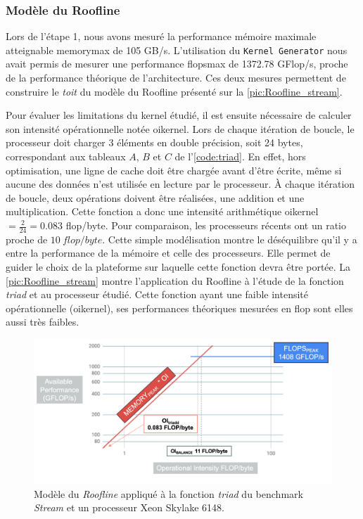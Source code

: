         
    
    \subsubsection{Modèle du Roofline}
        Lors de l'étape 1, nous avons mesuré la performance mémoire maximale atteignable \gls{memorymax} de 105 GB/s. L'utilisation du \verb|Kernel Generator| nous avait permis de mesurer une performance \gls{flopsmax} de 1372.78 GFlop/s, proche de la performance théorique de l'architecture. Ces deux mesures permettent de construire le \textit{toit} du modèle du Roofline présenté sur la \autoref{pic:Roofline_stream}.
        
        Pour évaluer les limitations du \gls{kernel} étudié, il est ensuite nécessaire de calculer son intensité opérationnelle notée \gls{oikernel}. Lors de chaque itération de boucle, le processeur doit charger 3 éléments en double précision, soit 24 bytes, correspondant aux tableaux $A$, $B$ et $C$ de l'\autoref{code:triad}. En effet, hors optimisation, une ligne de cache doit être chargée avant d'être écrite, même si aucune des données n'est utilisée en lecture par le processeur. À chaque itération de boucle, deux opérations doivent être réalisées, une addition et une multiplication. Cette fonction a donc une intensité arithmétique \gls{oikernel} $= \frac{2}{24} = 0.083$ flop/byte.
        Pour comparaison, les processeurs récents ont un ratio proche de $10\ flop/byte$. Cette simple modélisation montre le déséquilibre qu'il y a entre la performance de la mémoire et celle des processeurs. Elle permet de guider le choix de la plateforme sur laquelle cette fonction devra être portée. La \autoref{pic:Roofline_stream} montre l'application du Roofline à l'étude de la fonction \textit{triad} et au processeur étudié. Cette fonction ayant une faible intensité opérationnelle (\gls{oikernel}), ses performances théoriques mesurées en flop sont elles aussi très faibles.
        
        \begin{figure}
            \center
            \includegraphics[width=14cm]{images/roofline_stream.png}
            \caption{\label{pic:Roofline_stream} Modèle du \textit{Roofline} appliqué à la fonction \textit{triad} du benchmark \textit{Stream} et un processeur Xeon Skylake 6148.}
        \end{figure}
    


